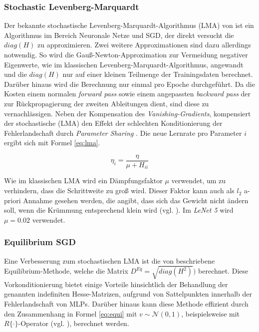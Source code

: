 \subsubsection{Stochastic Levenberg-Marquardt}
Der bekannte stochastische Levenberg-Marquardt-Algorithmus (LMA) von \cite{LeCun1998b} ist ein Algorithmus im Bereich Neuronale Netze und SGD, der direkt versucht die $diag(H)$ zu approximieren. Zwei weitere Approximationen sind dazu allerdings notwendig. So wird die  Gauß-Newton-Approximation zur Vermeidung negativer Eigenwerte, wie im klassischen Levenberg-Marquardt-Algorithmus, angewandt und die $diag(H)$ nur auf einer kleinen Teilmenge der Trainingsdaten berechnet. Darüber hinaus wird die Berechnung nur einmal pro Epoche durchgeführt. Da die Kosten einem normalen \textit{forward pass} sowie einem angepassten \textit{backward pass} der zur Rückpropagierung der zweiten Ableitungen dient, sind diese zu vernachlässigen. 
Neben der Kompensation des \textit{Vanishing-Gradients}, kompensiert der stochastische (LMA) den Effekt der schlechten Konditionierung der Fehlerlandschaft durch \textit{Parameter Sharing} \cite[vgl.][]{LeCun1998b}.
Die neue Lernrate pro Parameter $i$ ergibt sich mit Formel \ref{eq:lma}.

\begin{equation}
\label{eq:lma} 
\eta_{i} = \frac{\eta}{\mu + H_{ii}}
\end{equation}

Wie im klassischen LMA wird ein Dämpfungsfaktor $\mu$ verwendet, um zu verhindern, dass die Schrittweite zu groß wird. Dieser Faktor kann auch als $l_2$ a-priori Annahme gesehen werden, die angibt, dass sich das Gewicht nicht ändern soll, wenn die Krümmung entsprechend klein wird (vgl. \cite{Martens2010}). Im \textit{LeNet 5} wird $\mu = 0.02$ verwendet.


\subsubsection{Equilibrium SGD}
Eine Verbesserung zum stochastischen LMA ist die von \cite{Dauphin2015} beschriebene Equilibrium-Methode, welche die Matrix $D^{Eq} = \sqrt{diag(H^2)})$ berechnet. Diese Vorkonditionierung bietet einige Vorteile hinsichtlich der Behandlung der genannten indefiniten Hesse-Matrizen, aufgrund von Sattelpunkten innerhalb der Fehlerlandschaft von MLPs. Darüber hinaus kann diese Methode effizient durch den Zusammenhang in Formel \ref{eq:equi} mit $v \sim \mathcal{N} (0,1)$, beispielsweise mit $R\{\cdot\}$-Operator (vgl. \cite{Pearlmutter1994}), berechnet werden. 

